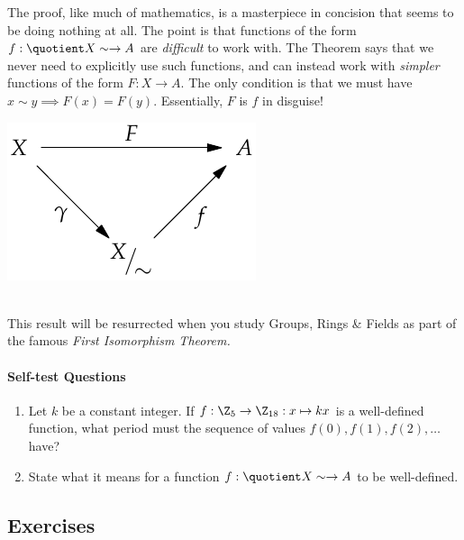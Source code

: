 \noindent\begin{minipage}{0.65\textwidth}
The proof, like much of mathematics, is a masterpiece in concision that seems to be doing nothing at all. The point is that functions of the form $f:\quotient X\sim\to A$ are \emph{difficult} to work with. The Theorem says that we never need to explicitly use such functions, and can instead work with \emph{simpler} functions of the form $F:X\to A$. The only condition is that we must have $x\sim y\implies F(x)=F(y)$. Essentially, $F$ is $f$ in disguise!
\end{minipage}\qquad\begin{minipage}{0.3\textwidth}
\includegraphics[width=\textwidth]{relations-17-isomthm}
\end{minipage}\\[2pt]

This result will be resurrected when you study Groups, Rings \& Fields as part of the famous \emph{First Isomorphism Theorem.}


\paragraph{Self-test Questions}

\begin{enumerate}
  \item Let $k$ be a constant integer. If $f:\Z_5\to\Z_{18}:x\mapsto kx$ is a well-defined function, what period must the sequence of values $f(0),f(1),f(2),\ldots$ have?
  \item State what it means for a function $f:\quotient X\sim\to A$ to be well-defined.
\end{enumerate}

\subsection*{Exercises}

